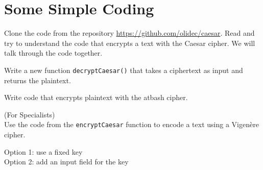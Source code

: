 \documentclass[11pt,a4paper]{report}
\begin{document}
\section{Some Simple Coding}

\begin{ex}
Clone the code from the repository \url{https://github.com/olidec/caesar}. Read and try to understand the code that encrypts a text with the Caesar cipher. We will talk through the code together.
\end{ex}

\begin{ex}
Write a new function \verb|decryptCaesar()| that takes a ciphertext as input and returns the plaintext.
\end{ex}

\begin{ex}
Write code that encrypts plaintext with the atbash cipher. 
\end{ex}

\begin{ex}
(For Specialists) \\
Use the code from the \verb|encryptCaesar| function to encode a text using a Vigenère cipher. 

Option 1: use a fixed key \\
Option 2: add an input field for the key
\end{ex}



%
\end{document}
